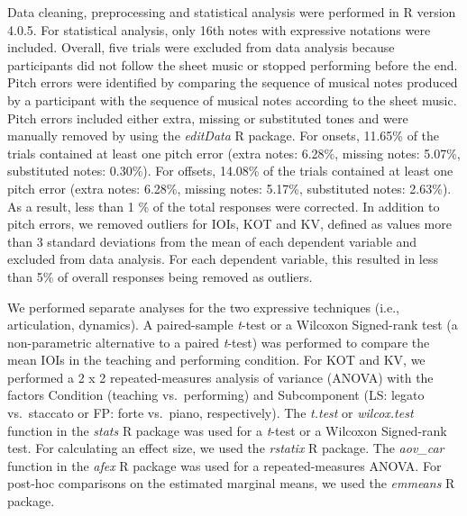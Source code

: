 \documentclass[
  english,
  man,floatsintext]{apa6}
\begin{document}
Data cleaning, preprocessing and statistical analysis were performed in R version 4.0.5. For statistical analysis, only 16th notes with expressive notations were included. Overall, five trials were excluded from data analysis because participants did not follow the sheet music or stopped performing before the end. Pitch errors were identified by comparing the sequence of musical notes produced by a participant with the sequence of musical notes according to the sheet music. Pitch errors included either extra, missing or substituted tones and were manually removed by using the \emph{editData} R package. For onsets, 11.65\% of the trials contained at least one pitch error (extra notes: 6.28\%, missing notes: 5.07\%, substituted notes: 0.30\%). For offsets, 14.08\% of the trials contained at least one pitch error (extra notes: 6.28\%, missing notes: 5.17\%, substituted notes: 2.63\%). As a result, less than 1 \% of the total responses were corrected. In addition to pitch errors, we removed outliers for IOIs, KOT and KV, defined as values more than 3 standard deviations from the mean of each dependent variable and excluded from data analysis. For each dependent variable, this resulted in less than 5\% of overall responses being removed as outliers.

We performed separate analyses for the two expressive techniques (i.e., articulation, dynamics). A paired-sample \emph{t}-test or a Wilcoxon Signed-rank test (a non-parametric alternative to a paired \emph{t}-test) was performed to compare the mean IOIs in the teaching and performing condition. For KOT and KV, we performed a 2 x 2 repeated-measures analysis of variance (ANOVA) with the factors Condition (teaching vs.~performing) and Subcomponent (LS: legato vs.~staccato or FP: forte vs.~piano, respectively). The \emph{t.test} or \emph{wilcox.test} function in the \emph{stats} R package was used for a \emph{t}-test or a Wilcoxon Signed-rank test. For calculating an effect size, we used the \emph{rstatix} R package. The \emph{aov\_car} function in the \emph{afex} R package was used for a repeated-measures ANOVA. For post-hoc comparisons on the estimated marginal means, we used the \emph{emmeans} R package.
\end{document}
